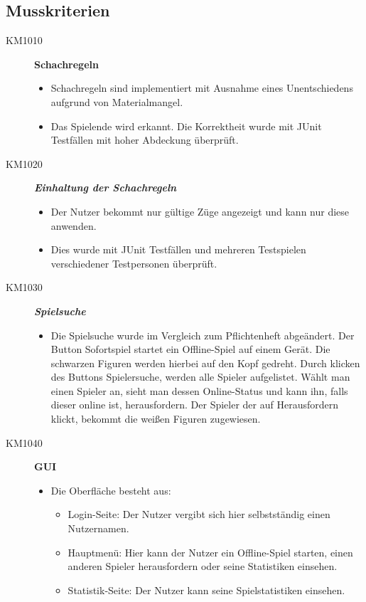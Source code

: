 \documentclass[parskip=full]{scrartcl}
\begin{document}
\subsection{Musskriterien}
\begin{description}
	\item[KM1010] \textbf{Schachregeln}
	\begin{itemize}
		\item Schachregeln sind implementiert mit Ausnahme eines Unentschiedens aufgrund von Materialmangel.
		\item Das Spielende wird erkannt. Die Korrektheit wurde mit JUnit Testfällen mit hoher Abdeckung überprüft.
	\end{itemize}
	\item[KM1020] \textbf{\textit{Einhaltung der Schachregeln}}
	\begin{itemize}
		\item Der Nutzer bekommt nur gültige Züge angezeigt und kann nur diese anwenden.
		\item Dies wurde mit JUnit Testfällen und mehreren Testspielen verschiedener Testpersonen überprüft.
	\end{itemize}
	\item[KM1030] \textbf{\textit{Spielsuche}}
	\begin{itemize}
		\item Die Spielsuche wurde im Vergleich zum Pflichtenheft abgeändert.
		Der Button Sofortspiel startet ein Offline-Spiel auf einem Gerät. Die schwarzen Figuren werden hierbei auf den Kopf gedreht.
		Durch klicken des Buttons Spielersuche, werden alle Spieler aufgelistet.
		Wählt man einen Spieler an, sieht man dessen Online-Status und kann ihn, falls dieser online ist, herausfordern. Der Spieler der auf Herausfordern klickt, bekommt die weißen Figuren zugewiesen.
	\end{itemize}
	\item[KM1040] \textbf{GUI}
	\begin{itemize}
		\item Die Oberfläche besteht aus:
		\begin{itemize}		
			\item Login-Seite: Der Nutzer vergibt sich hier selbstständig einen Nutzernamen.
			
			\item Hauptmenü: Hier kann der Nutzer ein Offline-Spiel starten, einen anderen Spieler herausfordern oder seine Statistiken einsehen.
			
			\item Statistik-Seite: Der Nutzer kann seine Spielstatistiken einsehen.
			

\end{itemize}
\end{itemize}
\end{description}
\end{document}
